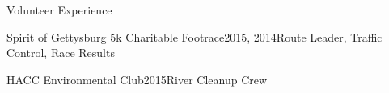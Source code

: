 \documentclass{resume} %
\begin{document}
\iffalse
\begin{rSection}{Volunteer Experience}

\iffalse
\begin{rWorkSubsection}{Lucky Orphans Horse Rescue}{2019}{}{}
\item Haven't started yet
\end{rWorkSubsection}


\begin{rWorkSubsection}{Rail Trail}{2019}{}{}
\item Haven't started yet
\end{rWorkSubsection}


\begin{rWorkSubsection}{HOPE Program Canine Rehabilitation}{2013}{Dog Handler}{}
\item Worked with professional dog trainer to train, care for, and rehabilitate unadoptable dogs, preparing them to be placed in permanent homes
\end{rWorkSubsection}
\fi

\begin{rVolunteerCondensed}{Spirit of Gettysburg 5k Charitable Footrace}{2015, 2014}{Route Leader, Traffic Control, Race Results}{}
\end{rVolunteerCondensed}


\begin{rVolunteerCondensed}{HACC Environmental Club}{2015}{River Cleanup Crew}{}
\end{rVolunteerCondensed}


\end{rSection}
\end{document}

